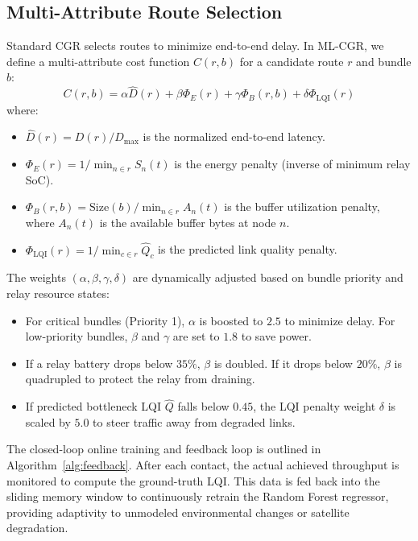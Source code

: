 \documentclass[a4paper,fleqn]{cas-dc}
\newcommand{\mlcgr}{\textsf{ML-CGR}}
\begin{document}
\subsection{Multi-Attribute Route Selection}
Standard CGR selects routes to minimize end-to-end delay. In \mlcgr{}, we define a multi-attribute cost function $C(r, b)$ for a candidate route $r$ and bundle $b$:
\begin{equation}
    C(r, b) = \alpha \hat{D}(r) + \beta \Phi_E(r) + \gamma \Phi_B(r, b) + \delta \Phi_{\text{LQI}}(r)
\end{equation}
where:
\begin{itemize}
    \item $\hat{D}(r) = D(r) / D_{\text{max}}$ is the normalized end-to-end latency.
    \item $\Phi_E(r) = 1 / \min_{n \in r} S_n(t)$ is the energy penalty (inverse of minimum relay SoC).
    \item $\Phi_B(r, b) = \text{Size}(b) / \min_{n \in r} A_n(t)$ is the buffer utilization penalty, where $A_n(t)$ is the available buffer bytes at node $n$.
    \item $\Phi_{\text{LQI}}(r) = 1 / \min_{c \in r} \hat{Q}_c$ is the predicted link quality penalty.
\end{itemize}
The weights $(\alpha, \beta, \gamma, \delta)$ are dynamically adjusted based on bundle priority and relay resource states:
\begin{itemize}
    \item For critical bundles (Priority 1), $\alpha$ is boosted to $2.5$ to minimize delay. For low-priority bundles, $\beta$ and $\gamma$ are set to $1.8$ to save power.
    \item If a relay battery drops below $35\%$, $\beta$ is doubled. If it drops below $20\%$, $\beta$ is quadrupled to protect the relay from draining.
    \item If predicted bottleneck LQI $\hat{Q}$ falls below $0.45$, the LQI penalty weight $\delta$ is scaled by $5.0$ to steer traffic away from degraded links.
\end{itemize}

The closed-loop online training and feedback loop is outlined in Algorithm~\ref{alg:feedback}. After each contact, the actual achieved throughput is monitored to compute the ground-truth LQI. This data is fed back into the sliding memory window to continuously retrain the Random Forest regressor, providing adaptivity to unmodeled environmental changes or satellite degradation.
\end{document}
